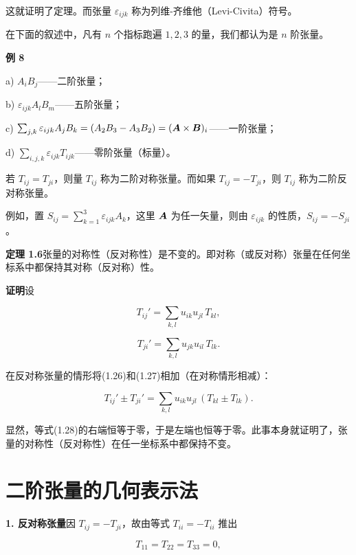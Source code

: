 这就证明了定理。而张量 $\varepsilon_{ijk}$ 称为列维-齐维他（Levi-Civita）符号。

在下面的叙述中，凡有 $n$ 个指标跑遍 $1, 2, 3$ 的量，我们都认为是 $n$ 阶张量。

\textbf{例 8}

a) $A_i B_j$——二阶张量；

b) $\varepsilon_{ijk} A_l B_m$——五阶张量；

c) $\sum_{j,k} \varepsilon_{ijk} A_j B_k = (A_2 B_3 - A_3 B_2) = (\bm{A} \times \bm{B})_i$——一阶张量；

d) $\sum_{i,j,k} \varepsilon_{ijk} T_{ijk}$——零阶张量（标量）。

若 $T_{ij} = T_{ji}$，则量 $T_{ij}$ 称为二阶对称张量。而如果 $T_{ij} = -T_{ji}$，则 $T_{ij}$ 称为二阶反对称张量。

例如，置 $S_{ij} = \sum_{k=1}^{3} \varepsilon_{ijk} A_k$，这里 $\bm{A}$ 为任一矢量，则由 $\varepsilon_{ijk}$ 的性质，$S_{ij} = -S_{ji}$。

\textbf{定理 1.6}\quad 张量的对称性（反对称性）是不变的。即对称（或反对称）张量在任何坐标系中都保持其对称（反对称）性。

\textbf{证明}\quad 设

\begin{equation}
T_{ij}' = \sum_{k,l} u_{ik} u_{jl}\, T_{kl},
\tag{1.26}
\end{equation}

\begin{equation}
T_{ji}' = \sum_{k,l} u_{jk} u_{il}\, T_{lk}.
\tag{1.27}
\end{equation}

在反对称张量的情形将(1.26)和(1.27)相加（在对称情形相减）：

\begin{equation}
T_{ij}' \pm T_{ji}' = \sum_{k,l} u_{ik} u_{jl}\, (T_{kl} \pm T_{lk}).
\tag{1.28}
\end{equation}

显然，等式(1.28)的右端恒等于零，于是左端也恒等于零。此事本身就证明了，张量的对称性（反对称性）在任一坐标系中都保持不变。

\section{二阶张量的几何表示法}

\textbf{1. 反对称张量}\quad 因 $T_{ij} = -T_{ji}$，故由等式 $T_{ii} = -T_{ii}$ 推出

\begin{equation*}
T_{11} = T_{22} = T_{33} = 0,
\end{equation*}

